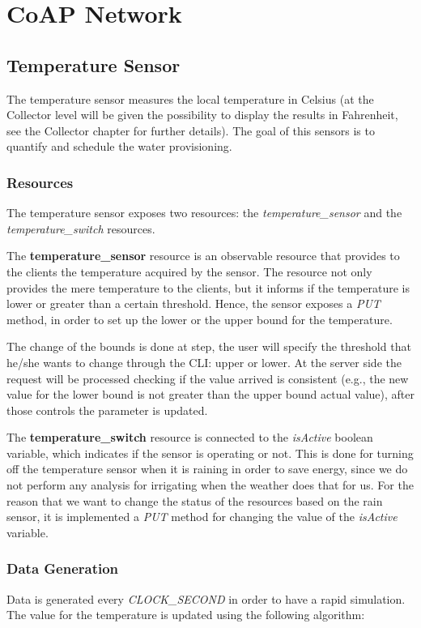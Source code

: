 \section{CoAP Network}


\subsection{Temperature Sensor}
The temperature sensor measures the local temperature in Celsius (at the Collector level will be given the possibility to display the results in Fahrenheit, see the Collector chapter for further details). The goal of this sensors is to quantify and schedule the water provisioning.

\subsubsection{Resources}
The temperature sensor exposes two resources: the \textit{temperature\_sensor} and the \textit{temperature\_switch} resources.

The \textbf{temperature\_sensor} resource is an observable resource that provides to the clients the temperature acquired by the sensor. The resource not only provides the mere temperature to the clients, but it informs if the temperature is lower or greater than a certain threshold. Hence, the sensor exposes a  \textit{PUT} method, in order to set up the lower or the upper bound for the temperature.

The change of the bounds is done at step, the user will specify the threshold that he/she wants to change through the CLI: upper or lower. At the server side the request will be processed checking if the value arrived is consistent (e.g., the new value for the lower bound is not greater than the upper bound actual value), after those controls the parameter is updated.

The \textbf{temperature\_switch} resource is connected to the \textit{isActive} boolean variable, which indicates if the sensor is operating or not. This is done for turning off the temperature sensor when it is raining in order to save energy, since we do not perform any analysis for irrigating when the weather does that for us. For the reason that we want to change the status of the resources based on the rain sensor, it is implemented a \textit{PUT} method for changing the value of the \textit{isActive} variable.

\subsubsection{Data Generation}
Data is generated every \textit{CLOCK\_SECOND} in order to have a rapid simulation. The value for the temperature is updated using the following algorithm:

